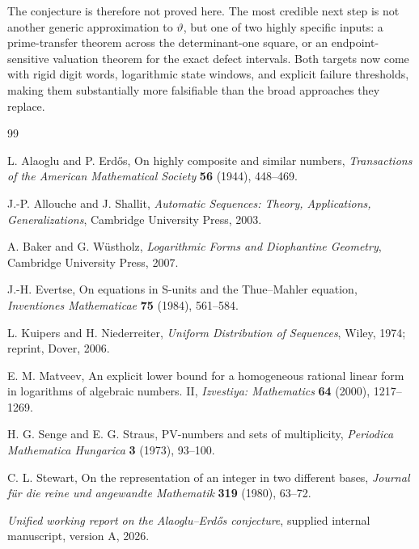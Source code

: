 \documentclass[11pt]{article}
\theoremstyle{definition}
\begin{document}
The conjecture is therefore not proved here.  The most credible next step is
not another generic approximation to \(\vartheta\), but one of two highly
specific inputs: a prime-transfer theorem across the determinant-one
square, or an endpoint-sensitive valuation theorem for the exact defect
intervals.  Both targets now come with rigid digit words, logarithmic state
windows, and explicit failure thresholds, making them substantially more
falsifiable than the broad approaches they replace.

\begin{thebibliography}{99}

L. Alaoglu and P. Erd\H{o}s,
\newblock On highly composite and similar numbers,
\newblock \emph{Transactions of the American Mathematical Society}
\textbf{56} (1944), 448--469.

J.-P. Allouche and J. Shallit,
\newblock \emph{Automatic Sequences: Theory, Applications, Generalizations},
\newblock Cambridge University Press, 2003.

A. Baker and G. W\"ustholz,
\newblock \emph{Logarithmic Forms and Diophantine Geometry},
\newblock Cambridge University Press, 2007.

J.-H. Evertse,
\newblock On equations in S-units and the Thue--Mahler equation,
\newblock \emph{Inventiones Mathematicae} \textbf{75} (1984), 561--584.

L. Kuipers and H. Niederreiter,
\newblock \emph{Uniform Distribution of Sequences},
\newblock Wiley, 1974; reprint, Dover, 2006.

E. M. Matveev,
\newblock An explicit lower bound for a homogeneous rational linear form in
logarithms of algebraic numbers. II,
\newblock \emph{Izvestiya: Mathematics} \textbf{64} (2000), 1217--1269.

H. G. Senge and E. G. Straus,
\newblock PV-numbers and sets of multiplicity,
\newblock \emph{Periodica Mathematica Hungarica} \textbf{3} (1973), 93--100.

C. L. Stewart,
\newblock On the representation of an integer in two different bases,
\newblock \emph{Journal f\"ur die reine und angewandte Mathematik}
\textbf{319} (1980), 63--72.

\newblock \emph{Unified working report on the Alaoglu--Erd\H{o}s conjecture},
\newblock supplied internal manuscript, version A, 2026.

\end{thebibliography}
\end{document}
